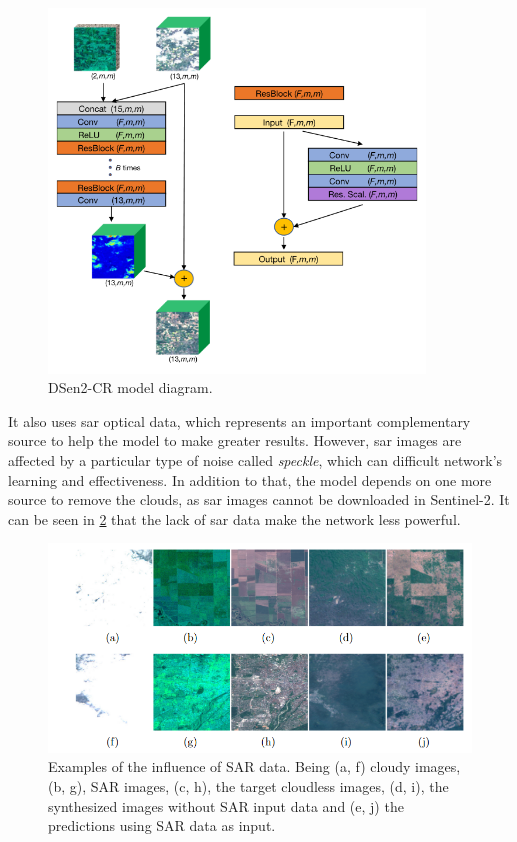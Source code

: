 \documentclass[11pt, a4paper]{article}
\begin{document}
	\begin{figure}[H]
		\centering
		\includegraphics[width=10cm]{imgs/relatedwork/sar.png}
		\caption{DSen2-CR model diagram.}
		\label{fig:related-dsen2-cr}
	\end{figure}
	 It also uses
	\gls{sar} 
	optical data, which represents an important complementary source to help the model to make greater results. However, \gls{sar} images are affected by a particular type of noise called \textit{speckle}, which can difficult network's learning and effectiveness. In addition to that, the model depends on one more source to remove the clouds, as \gls{sar} images cannot be downloaded in Sentinel-2. It can be seen in \ref{fig:related-dsen2-cr-predictions} that the lack of \gls{sar} data make the network less powerful. 
	\begin{figure}[H]
		\centering
		\includegraphics[width=13cm]{imgs/relatedwork/dsen2-cr-predictions.png}
		\caption{Examples of the influence of SAR data. Being (a, f) cloudy images, (b, g), SAR images, (c, h), the target cloudless images, (d, i), the synthesized images without SAR input data and (e, j) the predictions using SAR data as input.}
		\label{fig:related-dsen2-cr-predictions}
	\end{figure}
\end{document}

